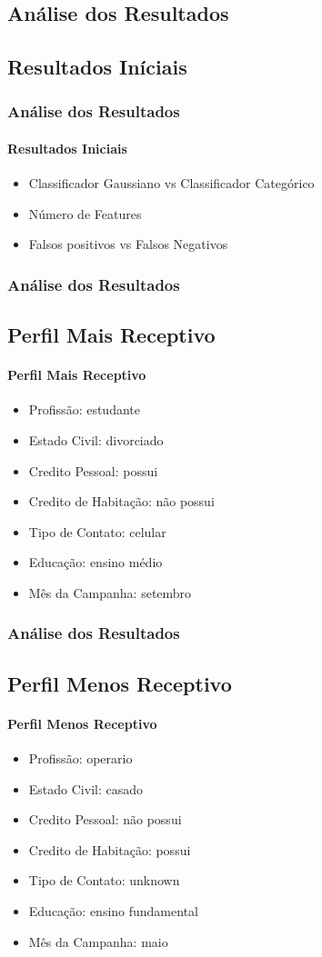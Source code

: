 \documentclass{beamer}
\begin{document}
\begin{frame}
\section{Análise dos Resultados}
\subsection{Resultados Iníciais}
\frametitle{Análise dos Resultados}
\framesubtitle{Resultados Iniciais}  
\begin{itemize}
\item Classificador Gaussiano vs Classificador Categórico
\item Número de Features
\item Falsos positivos vs Falsos Negativos
\end{itemize}
\end{frame}

\begin{frame}
    \frametitle{Análise dos Resultados}  
    \subsection{Perfil Mais Receptivo}
    \framesubtitle{Perfil Mais Receptivo}
    \begin{itemize}
    \item Profissão: estudante
    \item Estado Civil: divorciado
    \item Credito Pessoal: possui
    \item Credito de Habitação: não possui
    \item Tipo de Contato: celular
    \item Educação: ensino médio
    \item Mês da Campanha: setembro
    \end{itemize}
\end{frame}

\begin{frame}
    \frametitle{Análise dos Resultados}  
    \subsection{Perfil Menos Receptivo}
    \framesubtitle{Perfil Menos Receptivo}
    \begin{itemize}
    \item Profissão: operario
    \item Estado Civil: casado
    \item Credito Pessoal: não possui
    \item Credito de Habitação: possui
    \item Tipo de Contato: unknown
    \item Educação: ensino fundamental
    \item Mês da Campanha: maio
    \end{itemize}
\end{frame}
\end{document}
